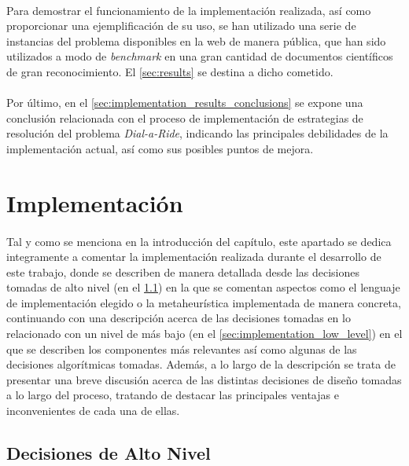 \documentclass{subfiles}
\begin{document}
      \paragraph{}
      Para demostrar el funcionamiento de la implementación realizada, así como proporcionar una ejemplificación de su uso, se han utilizado una serie de instancias del problema disponibles en la web de manera pública, que han sido utilizados a modo de \emph{benchmark} en una gran cantidad de documentos científicos de gran reconocimiento. El \cref{sec:results} se destina a dicho cometido. 
      
      \paragraph{}
      Por último, en el \cref{sec:implementation_results_conclusions} se expone una conclusión relacionada con el proceso de implementación de estrategias de resolución del problema \emph{Dial-a-Ride}, indicando las principales debilidades de la implementación actual, así como sus posibles puntos de mejora.

    \section{Implementación}
    \label{sec:implementation}
      
      \paragraph{}
      Tal y como se menciona en la introducción del capítulo, este apartado se dedica integramente a comentar la implementación realizada durante el desarrollo de este trabajo, donde se describen de manera detallada desde las decisiones tomadas de alto nivel (en el \cref{sec:implementation_high_level}) en la que se comentan aspectos como el lenguaje de implementación elegido o la metaheurística implementada de manera concreta, continuando con una descripción acerca de las decisiones tomadas en lo relacionado con un nivel de más bajo (en el \cref{sec:implementation_low_level}) en el que se describen los componentes más relevantes así como algunas de las decisiones algorítmicas tomadas. Además, a lo largo de la descripción se trata de presentar una breve discusión acerca de las distintas decisiones de diseño tomadas a lo largo del proceso, tratando de destacar las principales ventajas e inconvenientes de cada una de ellas.

      \subsection{Decisiones de Alto Nivel}
      \label{sec:implementation_high_level}
\end{document}
